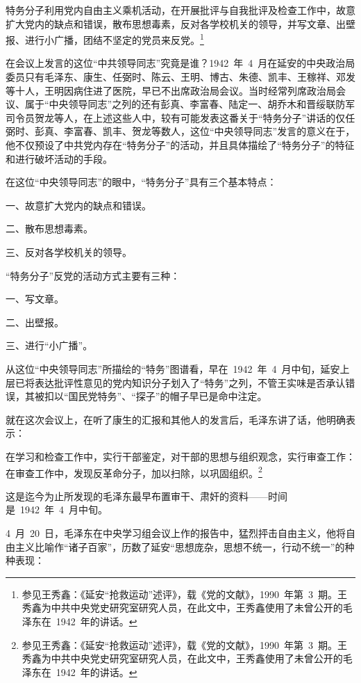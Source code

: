 \begin{quoting}
特务分子利用党内自由主义乘机活动，在开展批评与自我批评及检查工作中，故意扩大党内的缺点和错误，散布思想毒素，反对各学校机关的领导，并写文章、出壁报、进行小广播，团结不坚定的党员来反党。\footnote{参见王秀鑫：《延安“抢救运动”述评》，载《党的文献》，1990~年第~3~期。王秀鑫为中共中央党史研究室研究人员，在此文中，王秀鑫使用了未曾公开的毛泽东在~1942~年的讲话。}
\end{quoting}

在会议上发言的这位“中共领导同志”究竟是谁？1942~年~4~月在延安的中央政治局委员只有毛泽东、康生、任弼时、陈云、王明、博古、朱德、凯丰、王稼祥、邓发等十人，王明因病住进了医院，早已不出席政治局会议。当时经常列席政治局会议、属于“中央领导同志”之列的还有彭真、李富春、陆定一、胡乔木和晋绥联防军司令员贺龙等人，在上述这些人中，较有可能发表这番关于“特务分子”讲话的仅任弼时、彭真、李富春、凯丰、贺龙等数人，这位“中央领导同志”发言的意义在于，他不仅预设了中共党内存在“特务分子”的活动，并且具体描绘了“特务分子”的特征和进行破坏活动的手段。

在这位“中央领导同志”的眼中，“特务分子”具有三个基本特点：

一、故意扩大党内的缺点和错误。

二、散布思想毒素。

三、反对各学校机关的领导。

“特务分子”反党的活动方式主要有三种：

一、写文章。

二、出壁报。

三、进行“小广播”。

从这位“中央领导同志”所描绘的“特务”图谱看，早在~1942~年~4~月中旬，延安上层已将表达批评性意见的党内知识分子划入了“特务”之列，不管王实味是否承认错误，其被扣以“国民党特务”、“探子”的帽子早已是命中注定。

就在这次会议上，在听了康生的汇报和其他人的发言后，毛泽东讲了话，他明确表示：

\begin{quoting}
在学习和检查工作中，实行干部鉴定，对干部的思想与组织观念，实行审查工作：在审查工作中，发现反革命分子，加以扫除，以巩固组织。\footnote{参见王秀鑫：《延安“抢救运动”述评》，载《党的文献》，1990~年第~3~期。王秀鑫为中共中央党史研究室研究人员，在此文中，王秀鑫使用了未曾公开的毛泽东在~1942~年的讲话。}
\end{quoting}

这是迄今为止所发现的毛泽东最早布置审干、肃奸的资料——时间是~1942~年~4~月中旬。

4~月~20~日，毛泽东在中央学习组会议上作的报告中，猛烈抨击自由主义，他将自由主义比喻作“诸子百家”，历数了延安“思想庞杂，思想不统一，行动不统一”的种种表现：

